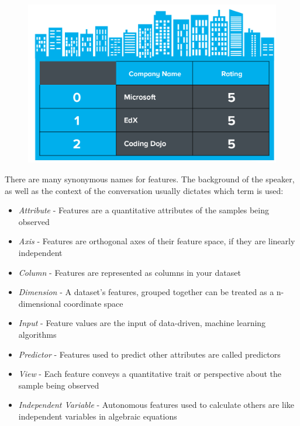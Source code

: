 \documentclass{article}
\begin{document}
\begin{figure}[H]
\centering
\includegraphics[width=0.8\linewidth]{pic/features-premiere-2.png}
\end{figure}

There are many synonymous names for features. The background of the speaker, as well as the context of the conversation usually dictates which term is used:

\begin{itemize}
	\item {\it{Attribute}} - Features are a quantitative attributes of the samples being observed
	\item {\it{Axis}} - Features are orthogonal axes of their feature space, if they are linearly independent
	\item {\it{Column}} - Features are represented as columns in your dataset
	\item {\it{Dimension}} - A dataset's features, grouped together can be treated as a n-dimensional coordinate space
	\item {\it{Input}} - Feature values are the input of data-driven, machine learning algorithms
	\item {\it{Predictor}} - Features used to predict other attributes are called predictors
	\item {\it{View}} - Each feature conveys a quantitative trait or perspective about the sample being observed
	\item {\it{Independent Variable}} - Autonomous features used to calculate others are like independent variables in algebraic equations
\end{itemize}
\end{document}
